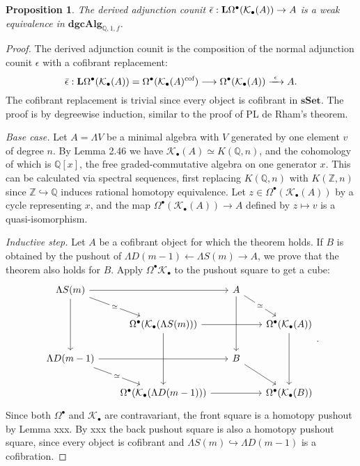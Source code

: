 \documentclass[psamsfonts]{amsart}
\newtheorem{prop}{Proposition}[section]
\theoremstyle{definition}
\newcommand{\Q}{\mathbb{Q}}
\newcommand{\Z}{\mathbb{Z}}
\newcommand{\sSet}{\mathbf{sSet}}
\newcommand{\dgcAlg}{\mathbf{dgcAlg}}
\numberwithin{equation}{section}
\begin{document}
\begin{prop}
The derived adjunction counit $\Bar{\epsilon}:\mathbf{L}\Omega^\bullet(\mathcal{K}_\bullet(A))\to A$ is a weak equivalence in $\dgcAlg_{\Q,1,f}$.  
\end{prop}
\begin{proof}

The derived adjunction counit is the composition of the normal adjunction counit $\epsilon$ with a cofibrant replacement:
\[\Bar{\epsilon}:\mathbf{L}\Omega^\bullet(\mathcal{K}_\bullet(A))=\Omega^\bullet(\mathcal{K}_\bullet(A)^\textrm{cof})\longrightarrow\Omega^\bullet(\mathcal{K}_\bullet(A))\xrightarrow{\ \epsilon\ }A.\]
The cofibrant replacement is trivial since every object is cofibrant in $\sSet$. The proof is by degreewise induction, similar to the proof of PL de Rham's theorem.\medbreak

\textit{Base case.} Let $A=\Lambda V$ be a minimal algebra with $V$ generated by one element $v$ of degree $n$. By Lemma 2.46 we have $\mathcal{K}_\bullet(A)\simeq K(\Q,n)$, and the cohomology of which is $\Q[x]$, the free graded-commutative algebra on one generator $x$. This can be calculated via spectral sequences, first replacing $K(\Q,n)$ with $K(\Z,n)$ since $\Z\hookrightarrow\Q$ induces rational homotopy equivalence. Let $z\in\Omega^\bullet(\mathcal{K}_\bullet(A))$ by a cycle representing $x$, and the map $\Omega^\bullet(\mathcal{K}_\bullet(A))\to A$ defined by $z\mapsto v$ is a quasi-isomorphism.\medbreak

\textit{Inductive step.} Let $A$ be a cofibrant object for which the theorem holds. If $B$ is obtained by the pushout of $\Lambda D(m-1)\leftarrow\Lambda S(m)\rightarrow A$, we prove that the theorem also holds for $B$. Apply $\Omega^\bullet\mathcal{K}_\bullet$ to the pushout square to get a cube:
\[\begin{tikzcd}[column sep=scriptsize]
\Lambda S(m)\arrow[rr]\arrow[dr,"\simeq"{description}]\arrow[dd]&& A\arrow[dd]\arrow[dr,"\simeq"{description}]\\
&\Omega^\bullet(\mathcal{K}_\bullet(\Lambda S(m)))\arrow[rr]\arrow[dd]&&\Omega^\bullet(\mathcal{K}_\bullet(A))\arrow[dd]\\
\Lambda D(m-1)\arrow[rr]\arrow[dr,"\simeq"{description}]&& B\arrow[dr]\\
&\Omega^\bullet(\mathcal{K}_\bullet(\Lambda D(m-1)))\arrow[rr]&&\Omega^\bullet(\mathcal{K}_\bullet(B))
\end{tikzcd}.\]
Since both $\Omega^\bullet$ and $\mathcal{K}_\bullet$ are contravariant, the front square is a homotopy pushout by Lemma xxx. By xxx the back pushout square is also a homotopy pushout square, since every object is cofibrant and $\Lambda S(m)\hookrightarrow\Lambda D(m-1)$ is a cofibration.


\end{proof}
\end{document}
